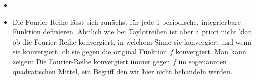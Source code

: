 \begin{Bemerkung}{
	\begin{itemize}
	\item[ ]
		\item Die Fourier-Reihe lässt sich zunächst für jede 1-periodische, 
		integrierbare Funktion definieren.
		Ähnlich wie bei Taylorreihen ist aber a priori nicht klar, ob die 
		Fourier-Reihe konvergiert, in welchem Sinne sie konvergiert und wenn sie 
		konvergiert, ob sie gegen die original Funktion $f$ konvergiert.
		Man kann zeigen: Die Fourier-Reihe konvergiert immer gegen $f$ im 
		sogenannten \glqq quadratischen Mittel\grqq{}, ein Begriff den wir hier 
		nicht behandeln werden.
	\end{itemize}
}\end{Bemerkung}
